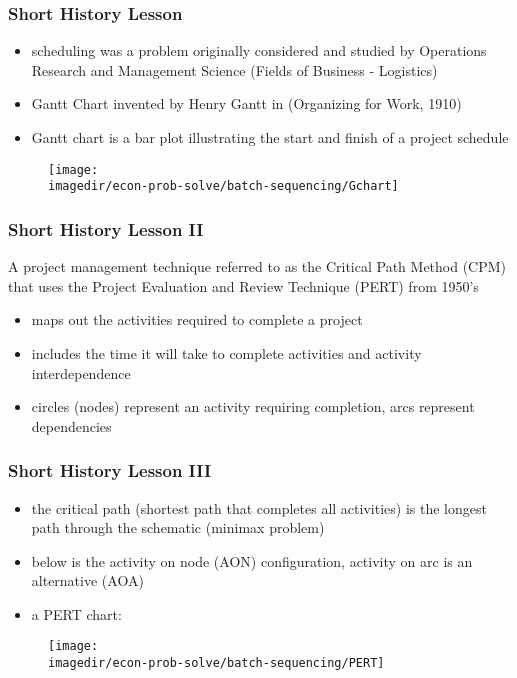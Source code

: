 \begin{frame}\frametitle{Short History Lesson}
	\begin{itemize}
		\item	scheduling was a problem originally considered and studied by Operations Research and Management Science (Fields of Business - Logistics) 
		\item	Gantt Chart invented by Henry Gantt in (Organizing for Work, 1910) 
		\item	Gantt chart is a bar plot illustrating the start and finish of a project schedule 
	\end{itemize}
	\begin{figure}
		[!htb] 
		\begin{center}
			\texttt{[image: \\imagedir/econ-prob-solve/batch-sequencing/Gchart]}
			
			\label{fig:Gchart} 
		\end{center}
	\end{figure}
\end{frame}

\begin{frame}\frametitle{Short History Lesson II}
	
	A project management technique referred to as the Critical Path Method (CPM) that uses the Project Evaluation and Review Technique (PERT) from 1950's
	\begin{itemize}
		\item	maps out the activities required to complete a project 
		\item	includes the time it will take to complete activities and activity interdependence 
		\item	circles (nodes) represent an activity requiring completion, arcs represent dependencies 
	\end{itemize}
\end{frame}

\begin{frame}\frametitle{Short History Lesson III}
	\begin{itemize}
		\item	the critical path (shortest path that completes all activities) is the longest path through the schematic (minimax problem) 
		\item	below is the activity on node (AON) configuration, activity on arc is an alternative (AOA) 
		\item	a PERT chart:
	\end{itemize}
	\begin{figure}
		[!htb] 
		\begin{center}
			\texttt{[image: \\imagedir/econ-prob-solve/batch-sequencing/PERT]} \label{fig:PERT} 
		\end{center}
	\end{figure}
\end{frame}


